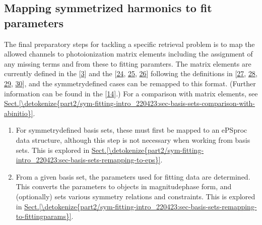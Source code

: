 \documentclass[letterpaper,table,10pt,english]{jupyterBook}
\begin{document}
\subsection{Mapping symmetrized harmonics to fit parameters}
\label{\detokenize{part2/sym-fitting-intro_220423:mapping-symmetrized-harmonics-to-fit-parameters}}\label{\detokenize{part2/sym-fitting-intro_220423:sec-basis-sets-mapping-params}}
\sphinxAtStartPar
The final preparatory steps for tackling a specific retrieval problem is to map the allowed channels to photoionization matrix elements \sphinxhyphen{} including the assignment of any missing terms \sphinxhyphen{} and from these to fitting paramters. The matrix elements are currently defined in the  {[}\hyperlink{cite.backmatter/bibliography:id668}{3}{]} and the  {[}\hyperlink{cite.backmatter/bibliography:id655}{24}, \hyperlink{cite.backmatter/bibliography:id597}{25}, \hyperlink{cite.backmatter/bibliography:id595}{26}{]} following the definitions in  {[}\hyperlink{cite.backmatter/bibliography:id747}{27}, \hyperlink{cite.backmatter/bibliography:id617}{28}, \hyperlink{cite.backmatter/bibliography:id786}{29}, \hyperlink{cite.backmatter/bibliography:id750}{30}{]}, and the symmetry\sphinxhyphen{}defined cases can be remapped to this format. (Further information can be found in the  {[}\hyperlink{cite.backmatter/bibliography:id667}{14}{]}.) For a comparison with  matrix elements, see \hyperref[\detokenize{part2/sym-fitting-intro_220423:sec-basis-sets-comparison-with-abinitio}]{Sect.\@ \ref{\detokenize{part2/sym-fitting-intro_220423:sec-basis-sets-comparison-with-abinitio}}}.
\begin{enumerate}
%
\item {} 
\sphinxAtStartPar
For symmetry\sphinxhyphen{}defined basis sets, these must first be mapped to an ePSproc data structure, although this step is not necessary when working from  basis sets. This is explored in \hyperref[\detokenize{part2/sym-fitting-intro_220423:sec-basis-sets-remapping-to-eps}]{Sect.\@ \ref{\detokenize{part2/sym-fitting-intro_220423:sec-basis-sets-remapping-to-eps}}}.

\item {} 
\sphinxAtStartPar
From a given basis set, the parameters used for fitting data are determined. This converts the parameters to  objects in magnitude\sphinxhyphen{}phase form, and (optionally) sets various symmetry relations and constraints. This is explored in \hyperref[\detokenize{part2/sym-fitting-intro_220423:sec-basis-sets-remapping-to-fittingparams}]{Sect.\@ \ref{\detokenize{part2/sym-fitting-intro_220423:sec-basis-sets-remapping-to-fittingparams}}}.

\end{enumerate}
\end{document}

